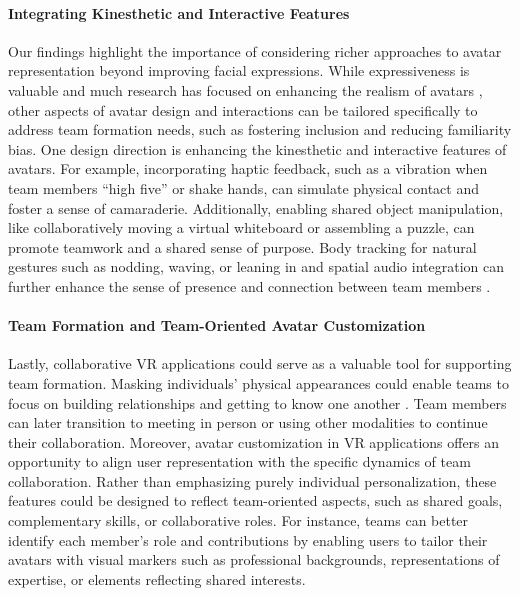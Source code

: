\paragraph{Integrating Kinesthetic and Interactive Features}
Our findings highlight the importance of considering richer approaches to avatar representation beyond improving facial expressions. While expressiveness is valuable and much research has focused on enhancing the realism of avatars \cite{waltemate2018impact, oh2016let}, other aspects of avatar design and interactions can be tailored specifically to address team formation needs, such as fostering inclusion and reducing familiarity bias. One design direction is enhancing the kinesthetic and interactive features of avatars. For example, incorporating haptic feedback, such as a vibration when team members ``high five'' or shake hands, can simulate physical contact and foster a sense of camaraderie. Additionally, enabling shared object manipulation, like collaboratively moving a virtual whiteboard or assembling a puzzle, can promote teamwork and a shared sense of purpose. Body tracking for natural gestures such as nodding, waving, or leaning in and spatial audio integration can further enhance the sense of presence and connection between team members \cite{abbas2023virtual, li2021social, williamson2022digital}.

\paragraph{Team Formation and Team-Oriented Avatar Customization}
Lastly, collaborative VR applications could serve as a valuable tool for supporting team formation. Masking individuals' physical appearances could enable teams to focus on building relationships and getting to know one another \cite{Whiting2020}. Team members can later transition to meeting in person or using other modalities to continue their collaboration. Moreover, avatar customization in VR applications offers an opportunity to align user representation with the specific dynamics of team collaboration. Rather than emphasizing purely individual personalization, these features could be designed to reflect team-oriented aspects, such as shared goals, complementary skills, or collaborative roles. For instance, teams can better identify each member's role and contributions by enabling users to tailor their avatars with visual markers such as professional backgrounds, representations of expertise, or elements reflecting shared interests.

